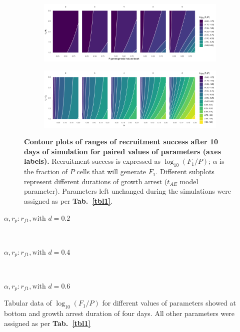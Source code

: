\documentclass[a4paper,oneside]{article}
\begin{document}
    \begin{figure}[p]
      \centering
      \begin{subfigure}{\textwidth}
        \includegraphics[width=\linewidth]{imgs/a.pdf}
      \end{subfigure}

      \begin{subfigure}{\textwidth}
        \includegraphics[width=\linewidth]{imgs/b.pdf}
      \end{subfigure}
      \caption{\textbf{Contour plots of ranges of recruitment success after 10 days of simulation for paired values of parameters (axes labels).}
        Recruitment success is expressed as $\log_{10}(F_{1}/P)$; $\alpha$ is the fraction of $P$ cells that will generate $F_{1}$.
        Different subplots represent different durations of growth arrest ($t_{AE}$ model parameter).
        Parameters left unchanged during the simulations were assigned as per \textbf{Tab.~\ref{tbl1}}.
      }\label{swep}
    \end{figure}
    \begin{table}[p]
      \centering
      {%
        \begin{subtable}{12cm}\centering\scriptsize
          {}
          \caption{$\alpha, r_p:r_{f1}, \text{with } d = 0.2$}
        \end{subtable}
        \\
       \vspace{0.5cm}
        \begin{subtable}{12cm}\centering\scriptsize
          {}
          \caption{$\alpha, r_p:r_{f1}, \text{with } d = 0.4$}
        \end{subtable}
        \\
       \vspace{0.5cm}
        \begin{subtable}{12cm}\centering\scriptsize
          {}
          \caption{$\alpha, r_p:r_{f1}, \text{with } d = 0.6$}
        \end{subtable}
        \caption{Tabular data of $\log_{10}(F_{1}/P)$ for different values of parameters showed at bottom and growth arrest duration of four days. All other parameters were assigned as per \textbf{Tab.~\ref{tbl1}}}\label{tbl2}
      }
    \end{table}
%
\end{document}
